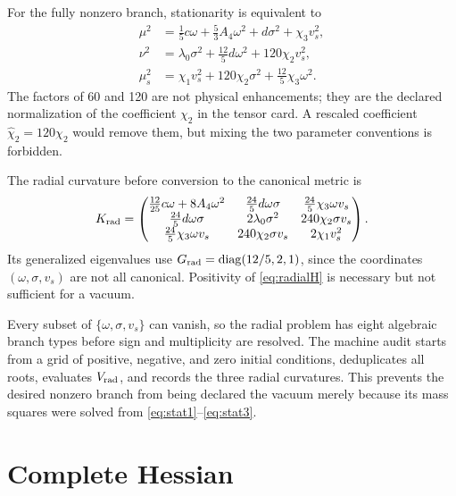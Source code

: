 \documentclass[11pt]{article}
\begin{document}
For the fully nonzero branch, stationarity is equivalent to
\begin{align}
\mu^2&=\frac15c\omega+\frac53A_4\omega^2+d\sigma^2+\chi_3v_s^2,
\label{eq:stat1}\\
\nu^2&=\lambda_0\sigma^2+\frac{12}{5}d\omega^2
+120\chi_2v_s^2,
\label{eq:stat2}\\
\mu_s^2&=\chi_1v_s^2+120\chi_2\sigma^2
+\frac{12}{5}\chi_3\omega^2.
\label{eq:stat3}
\end{align}
The factors of 60 and 120 are not physical enhancements; they are the
declared normalization of the coefficient $\chi_2$ in the tensor card.  A
rescaled coefficient $\widehat\chi_2=120\chi_2$ would remove them, but mixing
the two parameter conventions is forbidden.

The radial curvature before conversion to the canonical metric is
\begin{equation}
K_{\rm rad}=\begin{pmatrix}
\frac{12}{25}c\omega+8A_4\omega^2&\frac{24}{5}d\omega\sigma&\frac{24}{5}\chi_3\omega v_s\\
\frac{24}{5}d\omega\sigma&2\lambda_0\sigma^2&240\chi_2\sigma v_s\\
\frac{24}{5}\chi_3\omega v_s&240\chi_2\sigma v_s&2\chi_1v_s^2
\end{pmatrix}.
\label{eq:radialH}
\end{equation}
Its generalized eigenvalues use
$G_{\rm rad}=\operatorname{diag}(12/5,2,1)$, since the coordinates
$(\omega,\sigma,v_s)$ are not all canonical.  Positivity of
\eqref{eq:radialH} is necessary but not sufficient for a vacuum.

Every subset of $\{\omega,\sigma,v_s\}$ can vanish, so the radial problem has
eight algebraic branch types before sign and multiplicity are resolved.  The
machine audit starts from a grid of positive, negative, and zero initial
conditions, deduplicates all roots, evaluates $V_{\rm rad}$, and records the
three radial curvatures.  This prevents the desired nonzero branch from being
declared the vacuum merely because its mass squares were solved from
\eqref{eq:stat1}--\eqref{eq:stat3}.

\section{Complete Hessian}
\end{document}
